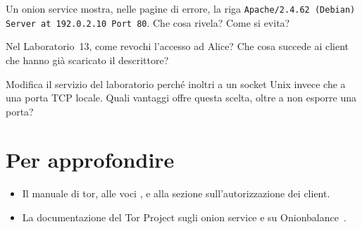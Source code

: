 \begin{esercizio}[2]\label{es:21-fuga}
Un onion service mostra, nelle pagine di errore, la riga \texttt{Apache/2.4.62 (Debian) Server at 192.0.2.10 Port 80}. Che cosa rivela? Come si evita?
\end{esercizio}

\begin{esercizio}[2]\label{es:21-revoca}
Nel Laboratorio~13, come revochi l'accesso ad Alice? Che cosa succede ai client che hanno già scaricato il descrittore?
\end{esercizio}

\begin{esercizio}[3]\label{es:21-socket}
Modifica il servizio del laboratorio perché inoltri a un socket Unix invece che a una porta TCP locale. Quali vantaggi offre questa scelta, oltre a non esporre una porta?
\end{esercizio}

\section*{Per approfondire}
\begin{itemize}
  \item Il manuale di tor, alle voci ,  e alla sezione sull'autorizzazione dei client.
  \item La documentazione del Tor Project sugli onion service e su Onionbalance~\cite{onionbalance}.
\end{itemize}
